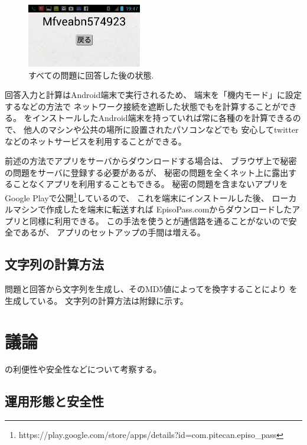 \documentclass[twoside]{wiss}
\begin{document}
\begin{figure}[H]
\centerline{\includegraphics[width=50mm,bb=0 0 720 400]{figures/android3crop.png}}
\caption{すべての問題に回答した後の状態.}
\label{android3}
\end{figure}

回答入力と{\PW}計算はAndroid端末で実行されるため、
端末を「機内モード」に設定するなどの方法で
ネットワーク接続を遮断した状態でも{\PW}を計算することができる。
{\EP}をインストールしたAndroid端末を持っていれば常に各種の{\PW}を計算できるので、
他人のマシンや公共の場所に設置されたパソコンなどでも
安心してtwitterなどのネットサービスを利用することができる。

前述の方法で{\EP}アプリをサーバからダウンロードする場合は、
ブラウザ上で秘密の問題をサーバに登録する必要があるが、
秘密の問題を全くネット上に露出することなくアプリを利用することもできる。
秘密の問題を含まない{\EP}アプリをGoogle Playで公開\footnote{
 {\textsf{https://play.google.com/{\allowbreak}store/{\allowbreak}apps/{\allowbreak}details?{\allowbreak}id=com.{\allowbreak}pitecan.{\allowbreak}episo\_pass}}
}しているので、
これを端末にインストールした後、
ローカルマシンで作成した{\SQ}を端末に転送すれば
EpisoPass.comからダウンロードしたアプリと同様に利用できる。
この手法を使うと{\SQ}が通信路を通ることがないので安全であるが、
アプリのセットアップの手間は増える。

\subsection{{\PW}文字列の計算方法}

問題と回答から文字列を生成し、そのMD5値によって{\SS}を換字することにより
{\PW}を生成している。
{\PW}文字列の計算方法は附録に示す。

\section{議論}

{\EP}の利便性や安全性などについて考察する。

\subsection{運用形態と安全性}
\end{document}
